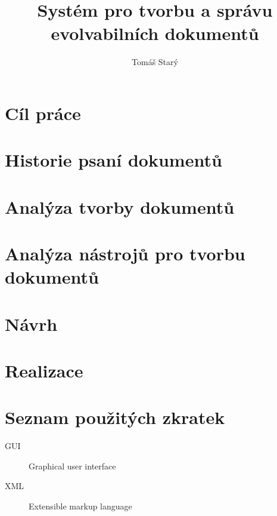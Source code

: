 \documentclass[thesis=B,czech]{FITthesis}[2012/06/26]
\title{Systém pro tvorbu a správu evolvabilních dokumentů}
\author{Tomáš Starý} %
\begin{document}

\begin{introduction}
	
\end{introduction}

\chapter{Cíl práce}


\chapter{Historie psaní dokumentů}


\chapter{Analýza tvorby dokumentů}


\chapter{Analýza nástrojů pro tvorbu dokumentů}


\chapter{Návrh}


\chapter{Realizace}



\begin{conclusion}
\end{conclusion}
\listoftodos
\printbibliography
\appendix

\chapter{Seznam použitých zkratek}
\begin{description}
	\item[GUI] Graphical user interface
	\item[XML] Extensible markup language
\end{description}
\end{document}
